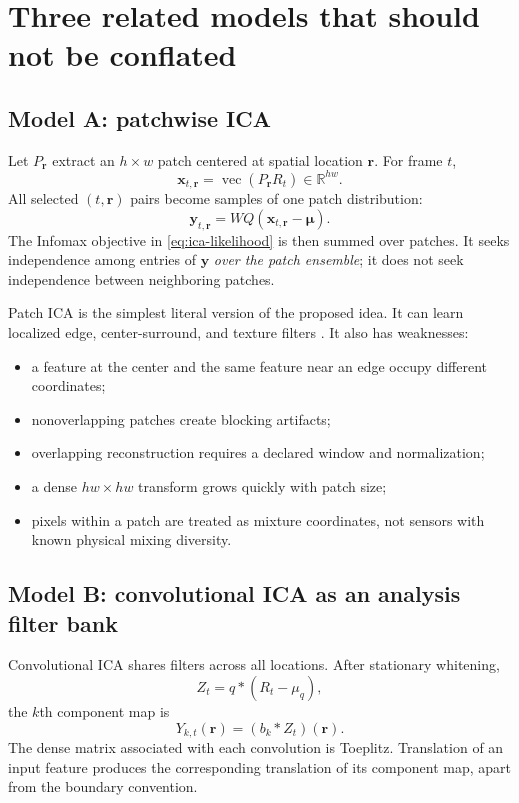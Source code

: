 \documentclass[11pt]{article}
\newcommand{\R}{\mathbb{R}}
\newcommand{\conv}{\mathbin{*}}
\begin{document}
\section{Three related models that should not be conflated}

\subsection{Model A: patchwise ICA}

Let $P_{\bm r}$ extract an $h\times w$ patch centered at spatial location
$\bm r$. For frame $t$,
\begin{equation}
\bm x_{t,\bm r}
=
\operatorname{vec}\!\left(P_{\bm r}R_t\right)
\in\R^{hw}.
\label{eq:patch-vector}
\end{equation}
All selected $(t,\bm r)$ pairs become samples of one patch distribution:
\begin{equation}
\bm y_{t,\bm r}
=
WQ(\bm x_{t,\bm r}-\bm\mu).
\label{eq:patch-ica}
\end{equation}
The Infomax objective in \cref{eq:ica-likelihood} is then summed over patches.
It seeks independence among entries of $\bm y$ \emph{over the patch ensemble};
it does not seek independence between neighboring patches.

Patch ICA is the simplest literal version of the proposed idea. It can learn
localized edge, center-surround, and texture filters
\cite{bellsejnowski1997edges}. It also has weaknesses:
\begin{itemize}[leftmargin=*]
\item a feature at the center and the same feature near an edge occupy different
coordinates;
\item nonoverlapping patches create blocking artifacts;
\item overlapping reconstruction requires a declared window and normalization;
\item a dense $hw\times hw$ transform grows quickly with patch size;
\item pixels within a patch are treated as mixture coordinates, not sensors with
known physical mixing diversity.
\end{itemize}

\subsection{Model B: convolutional ICA as an analysis filter bank}

Convolutional ICA shares filters across all locations. After stationary
whitening,
\begin{equation}
Z_t=q\conv (R_t-\mu_q),
\end{equation}
the $k$th component map is
\begin{equation}
Y_{k,t}(\bm r)
=
(b_k\conv Z_t)(\bm r).
\label{eq:spatial-cica}
\end{equation}
The dense matrix associated with each convolution is Toeplitz. Translation of
an input feature produces the corresponding translation of its component map,
apart from the boundary convention.
\end{document}
